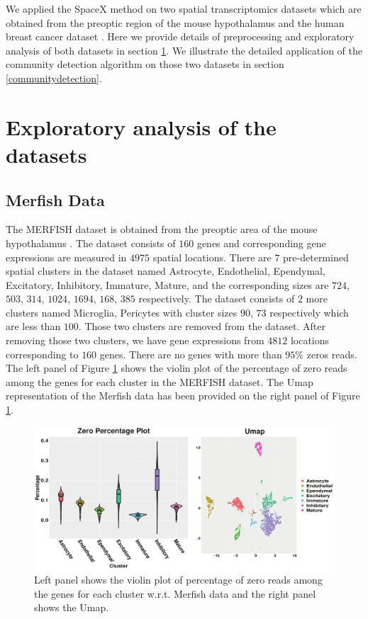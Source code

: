 \documentclass[
]{book}
\begin{document}
We applied the SpaceX method on two spatial transcriptomics datasets which are obtained from the preoptic region of the mouse hypothalamus \citep{Moffitteaau5324} and the human breast cancer dataset \citep{staahl2016visualization}. Here we provide details of preprocessing and exploratory analysis of both datasets in section \ref{exploratory}. We illustrate the detailed application of the community detection algorithm on those two datasets in section \ref{communitydetection}.

\hypertarget{exploratory}{%
\section{Exploratory analysis of the datasets}\label{exploratory}}

\hypertarget{merfish-data}{%
\subsection{Merfish Data}\label{merfish-data}}

The MERFISH dataset is obtained from the preoptic area of the mouse hypothalamus \citep{Moffitteaau5324}. The dataset consists of \(160\) genes and corresponding gene expressions are measured in \(4975\) spatial locations. There are \(7\) pre-determined spatial clusters in the dataset named Astrocyte, Endothelial, Ependymal, Excitatory, Inhibitory, Immature, Mature, and the corresponding sizes are \(724\), \(503\), \(314\), \(1024\), \(1694\), \(168\), \(385\) respectively. The dataset consists of \(2\) more clusters named Microglia, Pericytes with cluster sizes \(90\), \(73\) respectively which are less than \(100\). Those two clusters are removed from the dataset. After removing those two clusters, we have gene expressions from \(4812\) locations corresponding to \(160\) genes. There are no genes with more than \(95\%\) zeros reads. The left panel of Figure \ref{fig:zeroperMF} shows the violin plot of the percentage of zero reads among the genes for each cluster in the MERFISH dataset. The Umap representation of the Merfish data has been provided on the right panel of Figure \ref{fig:zeroperMF}.

\begin{figure}

{\centering \includegraphics[width=0.9\linewidth]{images/Merfish_zero_umap} 

}

\caption{Left panel shows the violin plot of percentage of zero reads among the genes for each cluster w.r.t. Merfish data and the right panel shows the Umap.}\label{fig:zeroperMF}
\end{figure}
\end{document}
